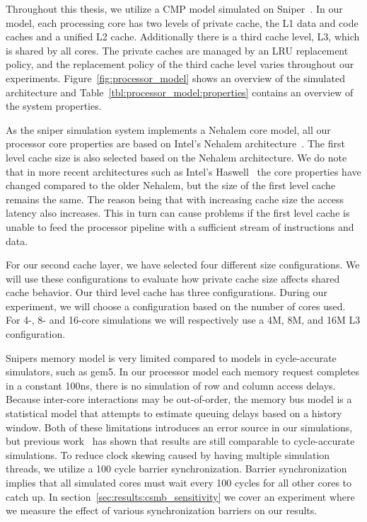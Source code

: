 Throughout this thesis, we utilize a CMP model simulated on Sniper~\cite{Carlson2011a}. 
In our model, each processing core has two levels of private cache, the L1 data and code caches and a unified L2 cache.
Additionally there is a third cache level, L3, which is shared by all cores. 
The private caches are managed by an LRU replacement policy, and the replacement policy of the third cache level varies throughout our experiments.
Figure~\ref{fig:processor_model} shows an overview of the simulated architecture and Table~\ref{tbl:processor_model:properties} contains an overview of the system properties.

As the sniper simulation system implements a Nehalem core model, all our processor core properties are based on Intel's Nehalem architecture~\cite{Thomadakis2011}. 
The first level cache size is also selected based on the Nehalem architecture. 
We do note that in more recent architectures such as Intel's Haswell~\cite{Jain2013} the core properties have changed compared to the older Nehalem, but the size of the first level cache remains the same.
The reason being that with increasing cache size the access latency also increases. 
This in turn can cause problems if the first level cache is unable to feed the processor pipeline with a sufficient stream of instructions and data.

For our second cache layer, we have selected four different size configurations.
We will use these configurations to evaluate how private cache size affects shared cache behavior.
Our third level cache has three configurations.
During our experiment, we will choose a configuration based on the number of cores used.
For 4-, 8- and 16-core simulations we will respectively use a 4M, 8M, and 16M L3 configuration.

Snipers memory model is very limited compared to models in cycle-accurate simulators, such as gem5.
In our processor model each memory request completes in a constant 100ns, there is no simulation of row and column access delays.
Because inter-core interactions may be out-of-order, the memory bus model is a statistical model that attempts to estimate queuing delays based on a history window.
Both of these limitations introduces an error source in our simulations, but previous work~\cite{Carlson2011a, Olsen2014} has shown that results are still comparable to cycle-accurate simulations.
To reduce clock skewing caused by having multiple simulation threads, we utilize a 100 cycle barrier synchronization.
Barrier synchronization implies that all simulated cores must wait every 100 cycles for all other cores to catch up.
In section~\ref{sec:results:csmb_sensitivity} we cover an experiment where we measure the effect of various synchronization barriers on our results.

